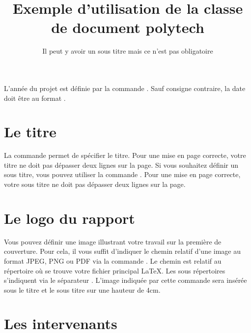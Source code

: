 \documentclass[overfullbox,hideweeklyreports,noseparatecontributorspage,nodate]{polytech/polytech}
\begin{document}
L'année du projet est définie par la commande . Sauf consigne contraire, la date doit être au format .
\begin{latexsource}
\end{latexsource}

\section{Le titre}

La commande  permet de spécifier le titre. Pour une mise en page correcte, votre titre ne doit pas dépasser deux lignes sur la page. Si vous souhaitez définir un sous titre, vous pouvez utiliser la commande . Pour une mise en page correcte, votre sous titre ne doit pas dépasser deux lignes sur la page.

\begin{latexsource}
\title{Exemple d'utilisation de la classe de document polytech}
\subtitle{Il peut y avoir un sous titre mais ce n'est pas obligatoire}
\end{latexsource}

\section{Le logo du rapport}

Vous pouvez définir une image illustrant votre travail sur la première de couverture. Pour cela, il vous suffit d'indiquer le chemin relatif d'une image au format JPEG, PNG ou PDF via la commande . Le chemin est relatif au répertoire où se trouve votre fichier principal \LaTeX. Les sous répertoires s'indiquent via le séparateur \latexcode{/}. L'image indiquée par cette commande sera insérée sous le titre et le sous titre sur une hauteur de 4cm.

\begin{latexsource}
\end{latexsource}

\section{Les intervenants}

\label{sec:intervenants}
\end{document}
